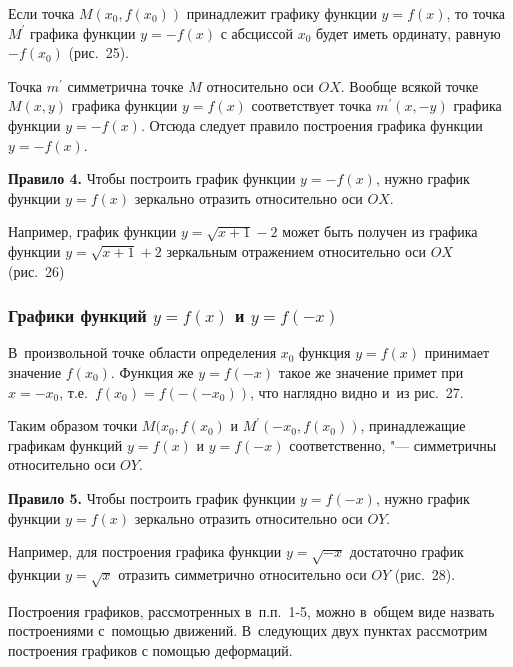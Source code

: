 Если точка $M(x_{0}, f(x_{0}))$ принадлежит графику функции $y = f(x)$,
то точка $M^{\prime}$ графика функции $y = -f(x)$ с абсциссой $x_{0}$
будет иметь ординату, равную $-f(x_{0})$ (рис.\ 25).

\begin{figure}
\end{figure}

Точка $m^{\prime}$ симметрична точке $M$ относительно оси $OX$.
Вообще всякой точке $M(x, y)$ графика функции $y = f(x)$ соответствует
точка $m^{\prime}(x, -y)$ графика функции $y = -f(x)$.
Отсюда следует правило построения графика функции $y = -f(x)$.

\textbf{Правило 4.} Чтобы построить график функции $y = -f(x)$,
нужно график функции $y = f(x)$ зеркально отразить относительно
оси $OX$.

Например, график функции $y = \sqrt{x + 1} - 2$ может быть получен
из графика функции $y = \sqrt{x + 1} + 2$ зеркальным отражением
относительно оси $OX$ (рис.\ 26)

\begin{figure}
\end{figure}


\subsubsection{Графики функций $y = f(x)$ и $y = f(-x)$}

В~произвольной точке области определения $x_{0}$ функция
$y = f(x)$ принимает значение $f(x_{0})$.
Функция же $y = f(-x)$ такое же значение примет при $x = -x_{0}$,
т.е.\ $f(x_{0}) = f(-(-x_{0}))$, что наглядно видно и~из рис.\ 27.

Таким образом точки $M(x_{0}, f(x_{0})$ и $M^{\prime}(-x_{0}, f(x_{0}))$,
принадлежащие графикам функций $y = f(x)$ и $y = f(-x)$ соответственно,
"--- симметричны относительно оси $OY$.

\textbf{Правило 5.} Чтобы построить график функции $y = f(-x)$,
нужно график функции $y = f(x)$ зеркально отразить относительно оси $OY$.

Например, для построения графика функции $y = \sqrt{-x}$ достаточно
график функции $y = \sqrt{x}$ отразить симметрично относительно оси $OY$
(рис.\ 28).

\begin{figure}
\end{figure}

\begin{Note}
Построения графиков, рассмотренных в~п.п.~1-5,
можно в~общем виде назвать построениями с~помощью движений.
В~следующих двух пунктах рассмотрим построения графиков с помощью
деформаций.
\end{Note}

